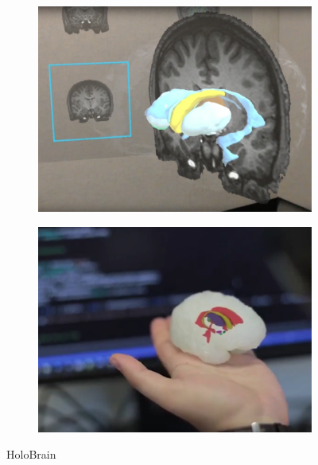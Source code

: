 \begin{figure}[H]
\begin{subfigure}[b]{0.33\textwidth}
        \includegraphics[width=\textwidth]{fig/holobrainmriaxis.png}
    \end{subfigure}
    \begin{subfigure}[b]{0.33\textwidth}
        \includegraphics[width=\textwidth]{fig/holobrainmagicwoodoo.png}
    \end{subfigure}
    \caption{HoloBrain}
    \label{fig:holobrain}
\end{figure}

